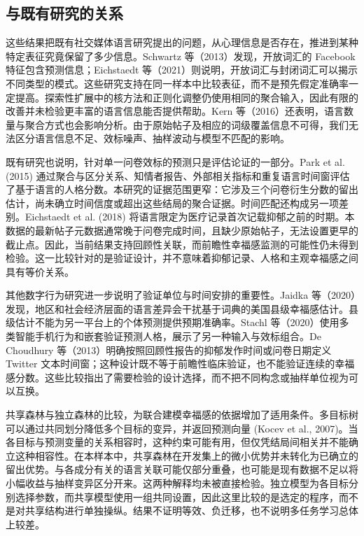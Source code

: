 \documentclass[11pt,letterpaper]{article}
\begin{document}
\subsection{与既有研究的关系}\label{ux4e0eux65e2ux6709ux7814ux7a76ux7684ux5173ux7cfb}

这些结果把既有社交媒体语言研究提出的问题，从心理信息是否存在，推进到某种特定表征究竟保留了多少信息。Schwartz 等（2013）发现，开放词汇的 Facebook 特征包含预测信息；Eichstaedt 等（2021）则说明，开放词汇与封闭词汇可以揭示不同类型的模式。这些研究支持在同一样本中比较表征，而不是预先假定准确率一定提高。探索性扩展中的核方法和正则化调整仍使用相同的聚合输入，因此有限的改善并未检验更丰富的语言信息能否提供帮助。Kern 等（2016）还表明，语言数量与聚合方式也会影响分析。由于原始帖子及相应的词级覆盖信息不可得，我们无法区分语言信息不足、效标噪声、抽样波动与模型不匹配的影响。

既有研究也说明，针对单一问卷效标的预测只是评估论证的一部分。Park et al. (2015) 通过聚合与区分关系、知情者报告、外部相关指标和重复语言时间窗评估了基于语言的人格分数。本研究的证据范围更窄：它涉及三个问卷衍生分数的留出估计，尚未确立时间信度或超出这些结局的聚合证据。时间匹配还构成另一项差别。Eichstaedt et al. (2018) 将语言限定为医疗记录首次记载抑郁之前的时期。本数据的最新帖子元数据通常晚于问卷完成时间，且缺少原始帖子，无法设置更早的截止点。因此，当前结果支持回顾性关联，而前瞻性幸福感监测的可能性仍未得到检验。这一比较针对的是验证设计，并不意味着抑郁记录、人格和主观幸福感之间具有等价关系。

其他数字行为研究进一步说明了验证单位与时间安排的重要性。Jaidka 等（2020）发现，地区和社会经济层面的语言差异会干扰基于词典的美国县级幸福感估计。县级估计不能为另一平台上的个体预测提供预期准确率。Stachl 等（2020）使用多类智能手机行为和嵌套验证预测人格，展示了另一种输入与效标组合。De Choudhury 等（2013）明确按照回顾性报告的抑郁发作时间或问卷日期定义 Twitter 文本时间窗；这种设计既不等于前瞻性临床验证，也不能验证连续的幸福感分数。这些比较指出了需要检验的设计选择，而不把不同构念或抽样单位视为可以互换。

共享森林与独立森林的比较，为联合建模幸福感的依据增加了适用条件。多目标树可以通过共同划分降低多个目标的变异，并返回预测向量 (Kocev et al., 2007)。当各目标与预测变量的关系相容时，这种约束可能有用，但仅凭结局间相关并不能确立这种相容性。在本样本中，共享森林在开发集上的微小优势并未转化为已确立的留出优势。与各成分有关的语言关联可能仅部分重叠，也可能是现有数据不足以将小幅收益与抽样变异区分开来。这两种解释均未被直接检验。独立模型为各目标分别选择参数，而共享模型使用一组共同设置，因此这里比较的是选定的程序，而不是对共享结构进行单独操纵。结果不证明等效、负迁移，也不说明多任务学习总体上较差。
\end{document}
